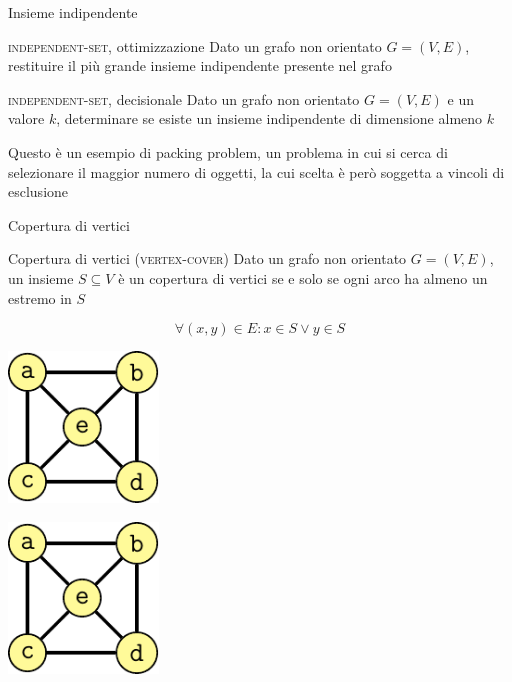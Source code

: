 \begin{frame}{Insieme indipendente}

\vspace{-9pt}
\begin{block}{\textsc{independent-set}, ottimizzazione}
Dato un grafo non orientato $G=(V,E)$, restituire il più grande insieme indipendente presente nel grafo
\end{block}

\begin{block}{\textsc{independent-set}, decisionale}
Dato un grafo non orientato $G=(V,E)$ e un valore $k$, determinare se esiste un insieme indipendente di dimensione almeno $k$
\end{block}

\bigskip
Questo è un esempio di \alert{packing problem}, un problema in cui si cerca
di selezionare il maggior numero di oggetti, la cui scelta è però soggetta
a vincoli di esclusione

\end{frame}


\begin{frame}{Copertura di vertici}


\vspace{-9pt}
\begin{block}{Copertura di vertici (\textsc{vertex-cover})}
Dato un grafo non orientato $G=(V,E)$, un insieme
$S \subseteq V$ è un \alert{copertura di vertici} se e solo se ogni arco ha almeno un  estremo in $S$

\vspace{-3pt}
\[
  \forall (x,y) \in E: x \in S \vee y \in S
\]
\end{block}

\bigskip
\begin{overprint}
\begin{center}
\includegraphics[width=0.3\textwidth,page=1]{cover.pdf}
\end{center}
\begin{center}
\includegraphics[width=0.3\textwidth,page=2]{cover.pdf}
\end{center}
\end{overprint}

\end{frame}

